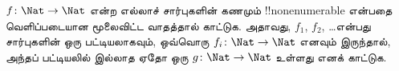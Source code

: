 \documentclass[../../../include/open-logic-section]{subfiles}
\begin{document}
\begin{prob}
$f \colon \Nat \to \Nat$ என்ற எல்லாச் சார்புகளின் கணமும்
!!{nonenumerable} என்பதை வெளிப்படையான மூலைவிட்ட வாதத்தால் காட்டுக.
அதாவது, $f_1$, $f_2$, \dots என்பது சார்புகளின் ஒரு பட்டியலாகவும்,
ஒவ்வொரு $f_i\colon \Nat \to \Nat$ எனவும் இருந்தால்,
அந்தப் பட்டியலில் இல்லாத ஏதோ ஒரு $g \colon \Nat \to \Nat$
உள்ளது எனக் காட்டுக.
\end{prob}
\end{document}
